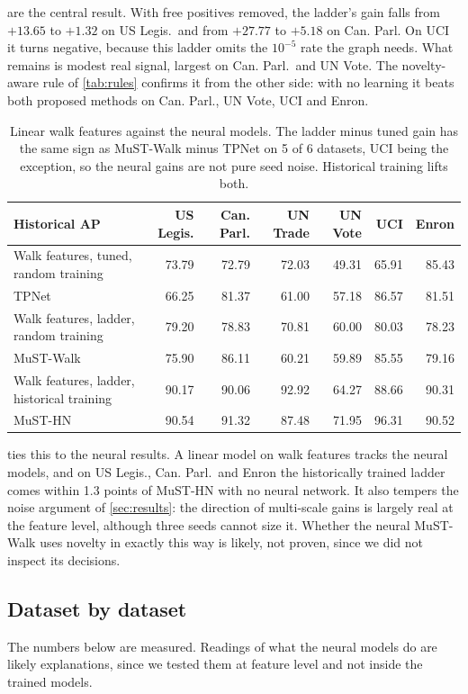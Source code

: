 \documentclass[11pt,a4paper]{article}
\theoremstyle{plain}
\theoremstyle{definition}
\begin{document}
 are the central result. With free positives removed, the ladder's gain falls from $+13.65$ to $+1.32$ on US Legis.\ and from $+27.77$ to $+5.18$ on Can. Parl. On UCI it turns negative, because this ladder omits the $10^{-5}$ rate the graph needs. What remains is modest real signal, largest on Can. Parl.\ and UN Vote. The novelty-aware rule of \cref{tab:rules} confirms it from the other side: with no learning it beats both proposed methods on Can. Parl., UN Vote, UCI and Enron.

\begin{table}[H]\centering\small
\begin{tabular}{lrrrrrr}
\toprule
Historical AP & US Legis. & Can. Parl. & UN Trade & UN Vote & UCI & Enron\\
\midrule
Walk features, tuned, random training & 73.79 & 72.79 & 72.03 & 49.31 & 65.91 & 85.43\\
TPNet & 66.25 & 81.37 & 61.00 & 57.18 & 86.57 & 81.51\\
Walk features, ladder, random training & 79.20 & 78.83 & 70.81 & 60.00 & 80.03 & 78.23\\
MuST-Walk & 75.90 & 86.11 & 60.21 & 59.89 & 85.55 & 79.16\\
Walk features, ladder, historical training & 90.17 & 90.06 & 92.92 & 64.27 & 88.66 & 90.31\\
MuST-HN & 90.54 & 91.32 & 87.48 & 71.95 & 96.31 & 90.52\\
\bottomrule
\end{tabular}
\caption{Linear walk features against the neural models. The ladder minus tuned gain has the same sign as MuST-Walk minus TPNet on 5 of 6 datasets, UCI being the exception, so the neural gains are not pure seed noise. Historical training lifts both.}\label{tab:neural}
\end{table}

 ties this to the neural results. A linear model on walk features tracks the neural models, and on US Legis., Can. Parl.\ and Enron the historically trained ladder comes within 1.3 points of MuST-HN with no neural network. It also tempers the noise argument of \cref{sec:results}: the direction of multi-scale gains is largely real at the feature level, although three seeds cannot size it. Whether the neural MuST-Walk uses novelty in exactly this way is likely, not proven, since we did not inspect its decisions.

\subsection{Dataset by dataset}
The numbers below are measured. Readings of what the neural models do are likely explanations, since we tested them at feature level and not inside the trained models.
\end{document}
